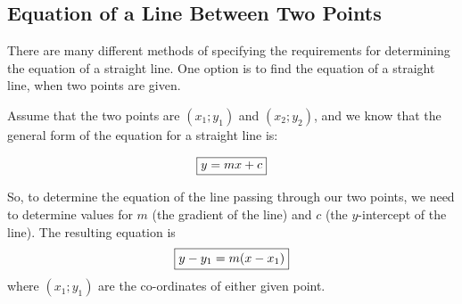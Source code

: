 \subsection{Equation of a Line Between Two Points}
There are many different methods of specifying the requirements for determining the equation of a straight line. One option is to find the equation of a straight line, when two points are given.

Assume that the two points are $(x_1;y_1)$ and $(x_2;y_2)$, and we know that the general form of the equation for a straight line is:

\begin{equation}\framebox{$y=mx+c$} \label{eq:mg:c:strline} \end{equation}

So, to determine the equation of the line passing through our two points, we need to determine values for $m$ (the gradient of the line) and $c$ (the $y$-intercept of the line). The resulting equation is
\begin{equation}\framebox{$y - y_1 = m(x-x_1)$}\label{eq:mg:c:strline2} \end{equation}
where $(x_1;y_1)$ are the co-ordinates of either given point.



